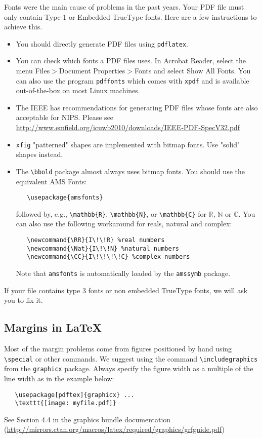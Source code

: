 \documentclass{article}
\def\CC{{C\nolinebreak[4]\hspace{-.05em}\raisebox{.4ex}{\tiny\bf ++}}}
\begin{document}
Fonts were the main cause of problems in the past years. Your PDF file
must only contain Type 1 or Embedded TrueType fonts. Here are a few
instructions to achieve this.

\begin{itemize}

\item You should directly generate PDF files using \verb+pdflatex+.

\item You can check which fonts a PDF files uses.  In Acrobat Reader,
  select the menu Files$>$Document Properties$>$Fonts and select Show
  All Fonts. You can also use the program \verb+pdffonts+ which comes
  with \verb+xpdf+ and is available out-of-the-box on most Linux
  machines.

\item The IEEE has recommendations for generating PDF files whose
  fonts are also acceptable for NIPS. Please see
  \url{http://www.emfield.org/icuwb2010/downloads/IEEE-PDF-SpecV32.pdf}

\item \verb+xfig+ "patterned" shapes are implemented with bitmap
  fonts.  Use "solid" shapes instead.

\item The \verb+\bbold+ package almost always uses bitmap fonts.  You
  should use the equivalent AMS Fonts:
\begin{verbatim}
   \usepackage{amsfonts}
\end{verbatim}
followed by, e.g., \verb+\mathbb{R}+, \verb+\mathbb{N}+, or
\verb+\mathbb{C}+ for $\mathbb{R}$, $\mathbb{N}$ or $\mathbb{C}$.  You
can also use the following workaround for reals, natural and complex:
\begin{verbatim}
   \newcommand{\RR}{I\!\!R} %real numbers
   \newcommand{\Nat}{I\!\!N} %natural numbers
   \newcommand{\CC}{I\!\!\!\!C} %complex numbers
\end{verbatim}
Note that \verb+amsfonts+ is automatically loaded by the
\verb+amssymb+ package.

\end{itemize}

If your file contains type 3 fonts or non embedded TrueType fonts, we
will ask you to fix it.

\subsection{Margins in \LaTeX{}}

Most of the margin problems come from figures positioned by hand using
\verb+\special+ or other commands. We suggest using the command
\verb+\includegraphics+ from the \verb+graphicx+ package. Always
specify the figure width as a multiple of the line width as in the
example below:
\begin{verbatim}
   \usepackage[pdftex]{graphicx} ...
   \texttt{[image: myfile.pdf]}
\end{verbatim}
See Section 4.4 in the graphics bundle documentation
(\url{http://mirrors.ctan.org/macros/latex/required/graphics/grfguide.pdf})
\end{document}

